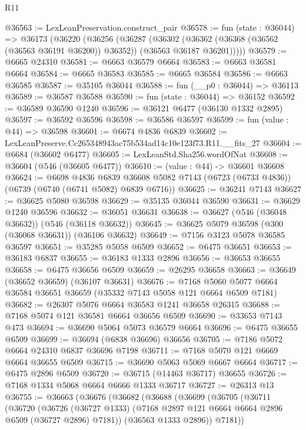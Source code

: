 \begin{lexlean}{R11}
\begin{coremodule}
@36563 := LexLeanPreservation.construct_pair
@36578 := fun (state : @36044) =>
  @36173
    (@36220
      (@36256
        (@36287
          (@36302
            (@36362 (@36368 (@36562 (@36563 @36191 @36200)) @36352))
            (@36563 @36187 @36201)))))
@36579 := @6665 @24310
@36581 := @6663 @36579 @6664
@36583 := @6663 @36581 @6664
@36584 := @6665 @36583
@36585 := @6665 @36584
@36586 := @6663 @36585
@36587 := @35105 @36044
@36588 := fun (__p0 : @36044) => @36113
@36589 := @36587 @36588
@36590 := fun (state : @36044) => @36152
@36592 := @36589 @36590 @1240
@36596 := @36121 @6477 (@36130 @1332 @2895)
@36597 := @36592 @36596
@36598 := @36586 @36597
@36599 := fun (value : @44) => @36598
@36601 := @6674 @4836 @6839
@36602 := LexLeanPreserve.Cc265348943ac75b534ad14c10e123f73.R11.__fits_27
@36604 := @6684 (@36602 @6477)
@36605 := LexLeanStd.Sha256.wordOfNat
@36608 := @36604 (@546 (@36605 @6477))
@36610 := (value : @44) -> @36601 @36608
@36624 := @6698
    @4836
    @6839
    @36608
    @5082
    @7143
    (@6723 (@6733 @4836))
    (@6739 (@6740 (@6741 @5082) @6839 @6716))
@36625 := @36241 @7143
@36627 := @36625 @5080 @36598
@36629 := @35135 @36044 @36590
@36631 := @36629 @1240 @36596
@36632 := @36051 @36631
@36638 := @36627 (@546 (@36048 @36632)) (@546 (@36118 @36632))
@36645 := @36625 @5079 @36598 (@300 (@36068 @36631)) (@36106 @36632)
@36649 := @7156 @3123 @5078 @36585 @36597
@36651 := @35285 @5058 @6509
@36652 := @6475 @36651
@36653 := @36183 @6837
@36655 := @36183 @1333 @2896
@36656 := @36653 @36655
@36658 := @6475 @36656 @6509
@36659 := @26295 @36658
@36663 := @36649 (@36652 @36659) (@36107 @36631)
@36676 := @7168 @5060 @5077 @6664 @36584 @36651 @36659 (@35332 @7143 @5058 @121 @6664 @6509 @7181)
@36682 := @26307 @5076 @6664 @36583 @1241 @36658 @26315
@36688 := @7168 @5074 @121 @36581 @6664 @36656 @6509
@36690 := @33653 @7143 @473
@36694 := @36690 @5064 @5073 @36579 @6664
@36696 := @6475 @36655 @6509
@36699 := @36694 (@6838 @36696) @36656
@36705 := @7186 @5072 @6664 @24310 @6837 @36696 @7198
@36711 := @7168 @5070 @121 @6669 @6664 @36655 @6509
@36715 := @36690 @5063 @5069 @6667 @6664
@36717 := @6475 @2896 @6509
@36720 := @36715 (@14463 @36717) @36655
@36726 := @7168 @1334 @5068 @6664 @6666 @1333 @36717
@36727 := @26313 @13
@36755 := @36663
    (@36676
      (@36682
        (@36688
          (@36699
            (@36705
              (@36711
                (@36720
                  (@36726
                    (@36727 @1333)
                    (@7168 @2897 @121 @6664 @6664 @2896 @6509 (@36727 @2896) @7181))
                  (@36563 @1333 @2896))
                @7181))

\end{coremodule}
\end{lexlean}
